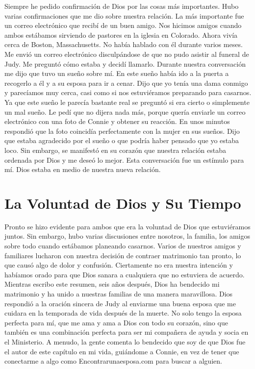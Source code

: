 \documentclass[twoside, 12pt]{book}
\begin{document}
Siempre he pedido confirmación de Dios por las cosas más importantes. Hubo varias confirmaciones que me dio sobre nuestra relación.  La más importante fue un correo electrónico que recibí de un buen amigo. Nos hicimos amigos cuando ambos estábamos sirviendo de pastores en la iglesia en Colorado. Ahora vivía cerca de Boston, Massachusetts.  No había hablado con él durante varios meses. Me envió un correo electrónico disculpándose de que no pudo asistir al funeral de Judy.  Me preguntó cómo estaba y decidí llamarlo. Durante nuestra conversación me dijo que tuvo un sueño sobre mí. En este sueño había ido a la puerta a recogerlo a él y a su esposa para ir a cenar. Dijo que yo tenía una dama conmigo y parecíamos muy cerca, casi como si nos estuviéramos preparando para casarnos. Ya que este sueño le parecía bastante real se preguntó si era cierto o simplemente un mal sueño. Le pedí que no dijera nada más, porque quería enviarle un correo electrónico con una foto de Connie y obtener su reacción. En unos minutos respondió que la foto coincidía perfectamente con la mujer en sus sueños. Dijo que estaba agradecido por el sueño o que podría haber pensado que yo estaba loco. Sin embargo, se manifestó en su corazón que nuestra relación estaba ordenada por Dios y me deseó lo mejor.  Esta conversación fue un estímulo para mí.  Dios estaba en medio de nuestra nueva relación.\\

\section{La Voluntad de Dios y Su Tiempo}

Pronto se hizo evidente para ambos que era la voluntad de Dios que estuviéramos juntos. Sin embargo, hubo varias discusiones entre nosotros, la familia, los amigos sobre todo cuando estábamos planeando casarnos. Varios de nuestros amigos y familiares lucharon con nuestra decisión de contraer matrimonio tan pronto, lo que causó algo de dolor y confusión. Ciertamente no era nuestra intención y habíamos orado para que Dios sanara a cualquiera que no estuviera de acuerdo.\\

Mientras escribo este resumen, seis años después, Dios ha bendecido mi matrimonio y ha unido a nuestras familias de una manera maravillosa.  Dios respondió a la oración sincera de Judy al enviarme una buena esposa que me cuidara en la temporada de vida después de la muerte. No solo tengo la esposa perfecta para mí, que me ama y ama a Dios con todo su corazón, sino que también es una combinación perfecta para ser mi compañera de ayuda y socia en el Ministerio. A menudo, la gente comenta lo bendecido que soy de que Dios fue el autor de este capítulo en mi vida, guiándome a Connie, en vez de tener que conectarme a algo como Encontrarunaesposa.com para buscar a alguien.\\
 
\end{document}
